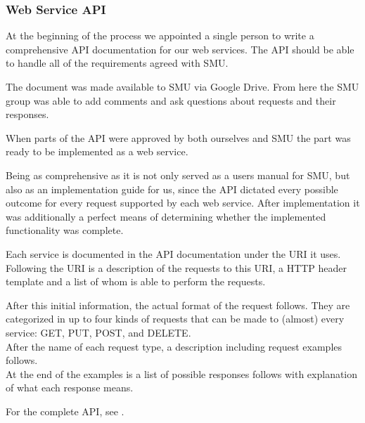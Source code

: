 \subsubsection{Web Service API}
At the beginning of the process we appointed a single person to write a comprehensive API documentation for our web services.
The API should be able to handle all of the requirements agreed  with SMU.

The document was made available to SMU via Google Drive. From here the SMU group was able to add comments and ask questions about requests  and their responses.

When parts of the API were approved by both ourselves and SMU the part was ready to be implemented as a web service.

Being as comprehensive as it is not only served as a users manual for SMU,  but also as an implementation guide for us, since the API dictated every possible outcome for every request supported by each web service. After implementation it was additionally a perfect means  of determining whether the implemented functionality was complete.

Each service is documented in the API documentation under the URI it uses. Following the URI is a description of the requests to this URI, a HTTP header template and a list of whom is able to perform the requests.

After this initial information, the actual format of the request follows. They are categorized in up to four kinds of requests that can be made to (almost) every service: GET, PUT, POST, and DELETE. \\
After the name of each request type, a description including request examples follows. \\
At the end of the examples  is a list of possible responses follows with explanation of what each response means.

For the complete API, see .
